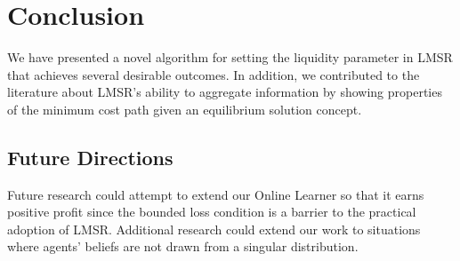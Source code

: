 \section{Conclusion}
We have presented a novel algorithm for setting the liquidity parameter in LMSR that achieves several desirable outcomes. In addition, we contributed to the literature about LMSR's ability to aggregate information by showing properties of the minimum cost path given an equilibrium solution concept. 

\subsection{Future Directions}
Future research could attempt to extend our Online Learner so that it earns positive profit since the bounded loss condition is a barrier to the practical adoption of LMSR. Additional research could extend our work to situations where agents' beliefs are not drawn from a singular distribution.